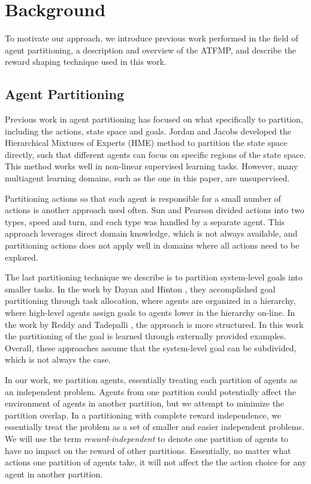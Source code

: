 \documentclass[letterpaper]{article}
\begin{document}
\section{Background}
\label{sec:BACKGROUND}

To motivate our approach, we introduce previous work performed in the field of agent partitioning, a description and overview of the ATFMP, and describe the reward shaping technique used in this work.

\subsection{Agent Partitioning}

Previous work in agent partitioning has focused on what specifically to partition, including the actions, state space and goals. Jordan and Jacobs \cite{716791} developed the Hierarchical Mixtures of Experts (HME) method to partition the state space directly, such that different agents can focus on specific regions of the state space. This method works well in non-linear supervised learning tasks. However, many multiagent learning domains, such as the one in this paper, are unsupervised.

Partitioning actions so that each agent is responsible for a small number of actions is another approach used often. Sun and Pearson \cite{Sun98someexperiments} divided actions into two types, speed and turn, and each type was handled by a separate agent. This approach leverages direct domain knowledge, which is not always available, and partitioning actions does not apply well in domains where all actions need to be explored.

The last partitioning technique we describe is to partition system-level goals into smaller tasks. In the work by Dayan and Hinton \cite{Dayan93feudalreinforcement}, they accomplished goal partitioning through task allocation, where agents are organized in a hierarchy, where high-level agents assign goals to agents lower in the hierarchy on-line. In the work by Reddy and Tadepalli \cite{Reddy_learninggoal-decomposition}, the approach is more structured. In this work the partitioning of the goal is learned through externally provided examples. Overall, these approaches assume that the system-level goal can be subdivided, which is not always the case. 

In our work, we partition agents, essentially treating each partition of agents as an independent problem. Agents from one partition could potentially affect the environment of agents in another partition, but we attempt to minimize the partition overlap. In a partitioning with complete reward independence, we essentially treat the problem as a set of smaller and easier independent problems. We will use the term \textit{reward-independent} to denote one partition of agents to have no impact on the reward of other partitions. Essentially, no matter what actions one partition of agents take, it will not affect the the action choice for any agent in another partition. 
\end{document}
